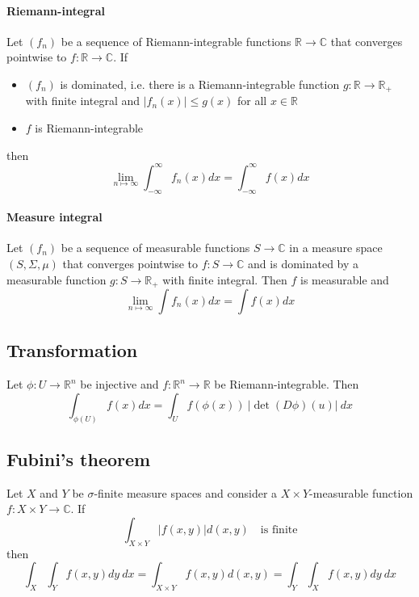 \documentclass{scrartcl}
\newcommand{\R}{\mathbb{R}}
\newcommand{\C}{\mathbb{C}}
\begin{document}
\paragraph{Riemann-integral}
Let $(f_n)$ be a sequence of Riemann-integrable functions $\R \to \C$ that converges pointwise to $f: \R \to \C$. If
\begin{itemize}
    \item $(f_n)$ is dominated, i.e. there is a Riemann-integrable function $g: \R \to \R_+$ with finite integral and $|f_n(x)| \leq g(x)$ for all $x \in \R$
    \item $f$ is Riemann-integrable
\end{itemize}
then
\begin{equation*}
    \lim_{n \mapsto \infty} \int_{-\infty}^{\infty} f_n(x) dx = \int_{-\infty}^{\infty} f(x) dx
\end{equation*}
\paragraph{Measure integral}
Let $(f_n)$ be a sequence of measurable functions $S \to \C$ in a measure space $(S, \Sigma, \mu)$ that converges pointwise to $f: S \to \C$ and is dominated by a measurable function $g: S \to \R_+$ with finite integral.
Then $f$ is measurable and
\begin{equation*}
    \lim_{n \mapsto \infty} \int f_n(x) dx = \int f(x) dx
\end{equation*}

\subsection{Transformation}
Let $\phi: U \to \mathbb{R}^n$ be injective and $f: \R^n \to \R$ be Riemann-integrable. Then
\begin{equation}
    \int_{\phi(U)} f(x) dx = \int_U f(\phi(x)) \ |\det(D\phi)(u)| \ dx \nonumber
\end{equation}

\subsection{Fubini's theorem}
Let $X$ and $Y$ be $\sigma$-finite measure spaces and consider a $X \times Y$-measurable function $f: X \times Y \to \C$. If
\begin{equation*}
    \int_{X \times Y} |f(x, y)| d(x, y) \quad \text{is finite}
\end{equation*}
then
\begin{equation*}
    \int_X \int_Y f(x, y) dy \ dx = \int_{X \times Y} f(x, y) d(x, y) = \int_Y \int_X f(x, y) dy \ dx
\end{equation*}
\end{document}
